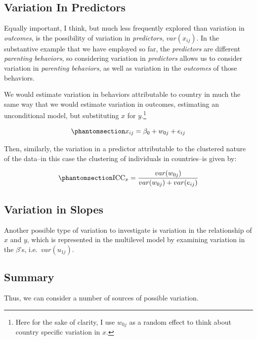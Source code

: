 \documentclass[
  letterpaper,
  DIV=11,
  numbers=noendperiod]{scrreprt}
\begin{document}
\subsection{Variation In Predictors}\label{variation-in-predictors}

Equally important, I think, but much less frequently explored than
variation in \emph{outcomes}, is the possibility of variation in
\emph{predictors}, \(var(x_{ij})\). In the substantive example that we
have employed so far, the \emph{predictors} are different
\emph{parenting behaviors}, so considering variation in
\emph{predictors} allows us to consider variation in \emph{parenting
behaviors}, as well as variation in the \emph{outcomes} of those
behaviors.

We would estimate variation in behaviors attributable to country in much
the same way that we would estimate variation in outcomes, estimating an
unconditional model, but substituting \(x\) for \(y\).\footnote{Here for
  the sake of clarity, I use \(w_{0j}\) as a random effect to think
  about country specific variation in \(x\).}

\begin{equation}\phantomsection\label{eq-unconditionalx}{x_{ij} = \beta_0 + w_{0j} + e_{ij}}\end{equation}

Then, similarly, the variation in a predictor attributable to the
clustered nature of the data--in this case the clustering of individuals
in countries--is given by:

\begin{equation}\phantomsection\label{eq-ICCx}{\text{ICC}_x = \frac{var(w_{0j})}{var(w_{0j}) + var(e_{ij})}}\end{equation}

\subsection{Variation in Slopes}\label{variation-in-slopes}

Another possible type of variation to investigate is variation in the
relationship of \(x\) and \(y\), which is represented in the multilevel
model by examining variation in the \(\beta\)'s, i.e.~\(var(u_{1j})\).

\subsection{Summary}\label{summary}

Thus, we can consider a number of sources of possible variation.
\end{document}
